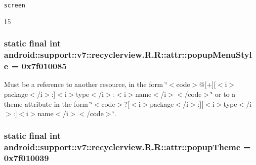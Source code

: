{\tt screen}

15\hypertarget{classandroid_1_1support_1_1v7_1_1recyclerview_1_1_r_1_1attr_4a1e3ea2b240f601ebb8a616d0ee3572}{
\subsubsection[{popupMenuStyle}]{\setlength{\rightskip}{0pt plus 5cm}static final int android::support::v7::recyclerview.R.R::attr::popupMenuStyle = 0x7f010085}}
\label{classandroid_1_1support_1_1v7_1_1recyclerview_1_1_r_1_1attr_4a1e3ea2b240f601ebb8a616d0ee3572}


Must be a reference to another resource, in the form \char`\"{}$<$code$>$@\mbox{[}+\mbox{]}\mbox{[}$<$i$>$package$<$/i$>$:\mbox{]}$<$i$>$type$<$/i$>$:$<$i$>$name$<$/i$>$$<$/code$>$\char`\"{} or to a theme attribute in the form \char`\"{}$<$code$>$?\mbox{[}$<$i$>$package$<$/i$>$:\mbox{]}\mbox{[}$<$i$>$type$<$/i$>$:\mbox{]}$<$i$>$name$<$/i$>$$<$/code$>$\char`\"{}. \hypertarget{classandroid_1_1support_1_1v7_1_1recyclerview_1_1_r_1_1attr_842acf24775732a7c5df90a50a1c5d17}{
\subsubsection[{popupTheme}]{\setlength{\rightskip}{0pt plus 5cm}static final int android::support::v7::recyclerview.R.R::attr::popupTheme = 0x7f010039}}
\label{classandroid_1_1support_1_1v7_1_1recyclerview_1_1_r_1_1attr_842acf24775732a7c5df90a50a1c5d17}


